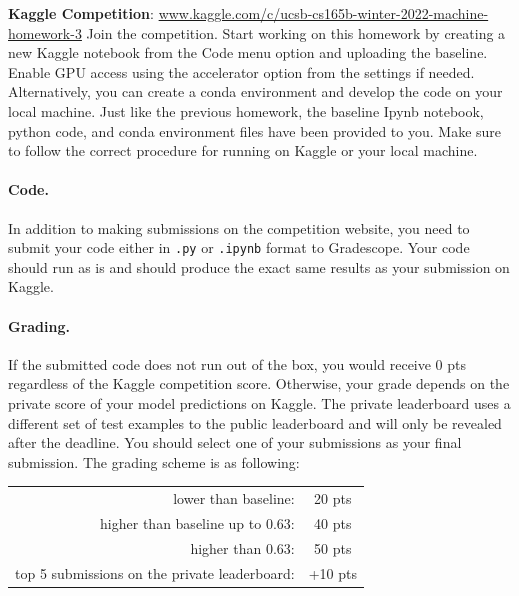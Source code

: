 \documentclass[11pt]{article}\pagestyle{plain}
\begin{document}
\textbf{Kaggle Competition}: \url{www.kaggle.com/c/ucsb-cs165b-winter-2022-machine-homework-3}
Join the competition. Start working on this homework by creating a new Kaggle notebook from the Code menu option and uploading the baseline. Enable GPU access using the accelerator option from the settings if needed. Alternatively, you can create a conda environment and develop the code on your local machine. Just like the previous homework, the baseline Ipynb notebook, python code, and conda environment files have been provided to you. Make sure to follow the correct procedure for running on Kaggle or your local machine. 

\paragraph{Code.} In addition to making submissions on the competition website, you need to submit your code either in \verb|.py| or \verb|.ipynb| format to Gradescope. Your code should run as is and should produce the exact same results as your submission on Kaggle.

\paragraph{Grading.} If the submitted code does not run out of the box, you would receive 0 pts regardless of the Kaggle competition score. Otherwise, your grade depends on the private score of your model predictions on Kaggle. The private leaderboard uses a different set of test examples to the public leaderboard and will only be revealed after the deadline. You should select one of your submissions as your final submission. The grading scheme is as following:

\begin{center}
	\begin{tabular}{rc}
		lower than baseline: & 20 pts \\
		higher than baseline up to 0.63: & 40 pts \\
		higher than 0.63: & 50 pts \\
		top 5 submissions on the private leaderboard: & +10 pts
	\end{tabular}
\end{center}
\end{document}
